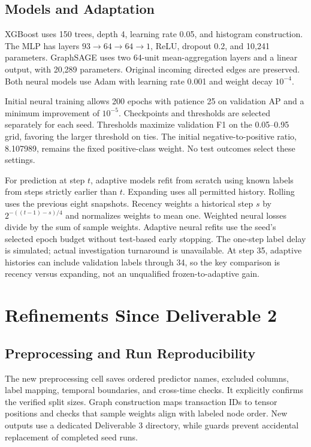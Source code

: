 \documentclass[10pt,twocolumn,letterpaper]{article}
\begin{document}
\subsection{Models and Adaptation}
XGBoost \cite{xgboost} uses 150 trees, depth 4, learning rate 0.05, and histogram construction. The MLP has layers $93\rightarrow64\rightarrow64\rightarrow1$, ReLU, dropout 0.2, and 10,241 parameters. GraphSAGE \cite{sage} uses two 64-unit mean-aggregation layers and a linear output, with 20,289 parameters. Original incoming directed edges are preserved. Both neural models use Adam with learning rate 0.001 and weight decay $10^{-4}$.

Initial neural training allows 200 epochs with patience 25 on validation AP and a minimum improvement of $10^{-5}$. Checkpoints and thresholds are selected separately for each seed. Thresholds maximize validation F1 on the 0.05--0.95 grid, favoring the larger threshold on ties. The initial negative-to-positive ratio, 8.107989, remains the fixed positive-class weight. No test outcomes select these settings.

For prediction at step $t$, adaptive models refit from scratch using known labels from steps strictly earlier than $t$. Expanding uses all permitted history. Rolling uses the previous eight snapshots. Recency weights a historical step $s$ by $2^{-((t-1)-s)/4}$ and normalizes weights to mean one. Weighted neural losses divide by the sum of sample weights. Adaptive neural refits use the seed's selected epoch budget without test-based early stopping. The one-step label delay is simulated; actual investigation turnaround is unavailable. At step 35, adaptive histories can include validation labels through 34, so the key comparison is recency versus expanding, not an unqualified frozen-to-adaptive gain.

\section{Refinements Since Deliverable 2}
\subsection{Preprocessing and Run Reproducibility}
The new preprocessing cell saves ordered predictor names, excluded columns, label mapping, temporal boundaries, and cross-time checks. It explicitly confirms the verified split sizes. Graph construction maps transaction IDs to tensor positions and checks that sample weights align with labeled node order. New outputs use a dedicated Deliverable 3 directory, while guards prevent accidental replacement of completed seed runs.
\end{document}
